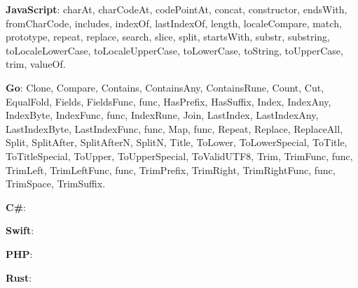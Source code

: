 \documentclass[anonymous,sigplan,review,11pt,nonacm,natbib=false]{acmart}
\begin{document}
    \textbf{JavaScript}: charAt, charCodeAt, codePointAt, concat, constructor, endsWith, fromCharCode, includes, indexOf, lastIndexOf, length, localeCompare, match, prototype, repeat, replace, search, slice, split, startsWith, substr, substring, toLocaleLowerCase, toLocaleUpperCase, toLowerCase, toString, toUpperCase, trim, valueOf.

    \textbf{Go}: Clone, Compare, Contains, ContainsAny, ContainsRune, Count, Cut, EqualFold, Fields, FieldsFunc, func, HasPrefix, HasSuffix, Index, IndexAny, IndexByte, IndexFunc, func, IndexRune, Join, LastIndex, LastIndexAny, LastIndexByte, LastIndexFunc, func, Map, func, Repeat, Replace, ReplaceAll, Split, SplitAfter, SplitAfterN, SplitN, Title, ToLower, ToLowerSpecial, ToTitle, ToTitleSpecial, ToUpper, ToUpperSpecial, ToValidUTF8, Trim, TrimFunc, func, TrimLeft, TrimLeftFunc, func, TrimPrefix, TrimRight, TrimRightFunc, func, TrimSpace, TrimSuffix.

    \textbf{C#}:

    \textbf{Swift}:

    \textbf{PHP}:

    \textbf{Rust}:

    \printbibliography
\end{document}
